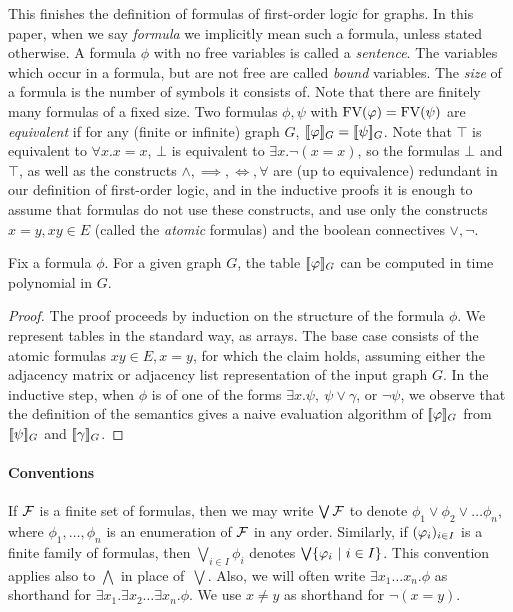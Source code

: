 This finishes the definition of formulas of first-order logic for graphs. In this paper, when we say \emph{formula} we implicitly mean such a formula, unless stated otherwise.
A formula $\phi$ with no free variables is called a \emph{sentence}. The variables which occur in a formula, but are not free are called \emph{bound} variables.
The \emph{size} of a formula is the number of symbols it consists of.
Note that there are finitely many formulas of a fixed size.
Two formulas $\phi, \psi$ with $\textrm{FV}(\varphi)=\textrm{FV}(\psi)$ are \emph{equivalent} if for any (finite or infinite) graph $G$, $[\![\varphi]\!]_G=[\![\psi]\!]_G$.
Note that $\top$ 
is equivalent to $\forall x.x=x$, $\bot$ is equivalent to $\exists x.\neg (x= x)$,
so the formulas $\bot$ and $\top$, as well as the constructs 
$\land,\implies,\iff,\forall$
 are (up to equivalence) redundant in our definition of first-order logic, and in the inductive proofs it is enough to assume that formulas do not use these constructs, and use only the constructs $x=y, xy\in E$
 (called the \emph{atomic} formulas) and the boolean connectives
 $\lor,\neg$.

\begin{proposition}\label{pro:fo-evaluation}
	Fix a formula $\phi$. For a given graph $G$, 
	the table $[\![\varphi]\!]_G$ can be computed in time polynomial in $G$.
\end{proposition}
\begin{proof}	
	The proof proceeds by induction on the structure of the formula $\phi$. We  represent tables in the standard way, as arrays.
	The base case consists of the atomic formulas $xy\in E,x=y$, for which the claim holds, assuming either the adjacency matrix or adjacency list representation of the input graph $G$. In the inductive step, when $\phi$ is of one of the forms $\exists x.\psi,\ \psi\lor\gamma$, or $\neg \psi$, we observe that the definition of the semantics gives a naive evaluation algorithm of $[\![\varphi]\!]_G$ from $[\![\psi]\!]_G$ and $[\![\gamma]\!]_G$.
\end{proof}


\paragraph{Conventions}
If $\cal F$ is a finite set of formulas, then we may write 
$\bigvee \cal F$ to denote $\phi_{1}\lor \phi_{2}\lor\ldots \phi_{n}$, where $\phi_1,\ldots,\phi_n$ is an enumeration of $\cal F$ in any order. Similarly, 
if $(\varphi_i)_{i\in I}$ is a finite family of formulas, then  $\bigvee_{i\in I} \phi_i$ denotes
$\bigvee \{\varphi_i\ |\ i\in I\}$. This convention applies also to $\bigwedge$ in place of~$\bigvee$.
Also, we will often write $\exists x_1\ldots x_n.\phi$ as  shorthand for $\exists x_1.\exists x_2\ldots\exists x_n.\phi$.
We use $x\neq y$ as shorthand for $\neg (x=y)$.

